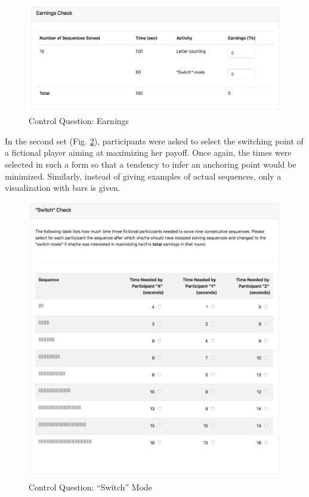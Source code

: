     \begin{figure}
        \centering
        \includegraphics[width=\textwidth]{graphs/cq_earnings.png}
        \caption{Control Question: Earnings}
        \label{fig:cq_earnings}
    \end{figure}
    
    In the second set (Fig. \ref{fig:cq_switch}), participants were asked to select the switching point of a fictional player aiming at maximizing her payoff. Once again, the times were selected in such a form so that a tendency to infer an anchoring point would be minimized. Similarly, instead of giving examples of actual sequences, only a visualization with bars is given.
    
    \begin{figure}
        \centering
        \includegraphics[width=\textwidth]{graphs/cq_switch.png}
        \caption{Control Question: ``Switch'' Mode}
        \label{fig:cq_switch}
    \end{figure}
    
